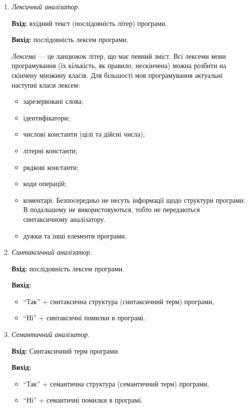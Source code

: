 \begin{enumerate}
	\item \textit{Лексичний аналізатор.} \medskip
	
	\textbf{Вхід:} вхідний текст (послідовність літер) програми. \medskip

	\textbf{Вихід:} послідовність лексем програми. \medskip

	\textit{Лексема} --- це ланцюжок літер, що має певний зміст. Всі лексеми мови
	програмування (їх кількість, як правило, нескінчена) можна розбити на скінчену
	множину класів. Для більшості мов програмування актуальні наступні класи
	лексем:
	\begin{itemize}
		\item зарезервовані слова;
		\item ідентифікатори;
		\item числові константи (цілі та дійсні числа);
		\item літерні константи;
		\item рядкові константи;
		\item коди операцій;
		\item коментарі. Безпосередньо не несуть інформації щодо структури
		програми. В подальшому не використовуються, тобто не передаються
		синтаксичному аналізатору.
		\item дужки та інші елементи програми.
	\end{itemize}

	\item \textit{Синтаксичний аналізатор.} \medskip

	\textbf{Вхід:} послідовність лексем програми. \medskip
	
	\textbf{Вихід:}
	\begin{itemize}
		\item ``Так'' + синтаксична структура (синтаксичний терм) програми,
		\item ``Ні'' + синтаксичні помилки в програмі.
	\end{itemize}

	\item \textit{Семантичний аналізатор.} \medskip

	\textbf{Вхід:} Синтаксичний терм програми. \medskip

	\textbf{Вихід:} \medskip
	\begin{itemize}
		\item ``Так'' + семантична структура (семантичний терм) програми,
		\item ``Ні'' + семантичні помилки в програмі.
	\end{itemize}


\end{enumerate}
